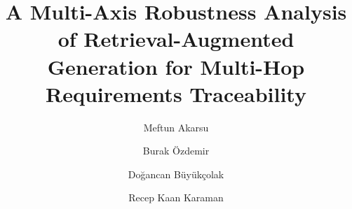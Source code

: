 \documentclass[runningheads]{llncs}
\newif\ifanonymous
\begin{document}
\title{A Multi-Axis Robustness Analysis of Retrieval-Augmented Generation
  for Multi-Hop Requirements Traceability}

\ifanonymous
\author{Anonymous Author(s)}
\authorrunning{Anonymous}
\institute{Anonymous Institution}
\else
\author{Meftun Akarsu \and
  Burak \"Ozdemir \and
  Do\u{g}ancan B\"uy\"uk\c{c}olak \and
  Recep Kaan Karaman}
\fi

\maketitle












\end{document}
